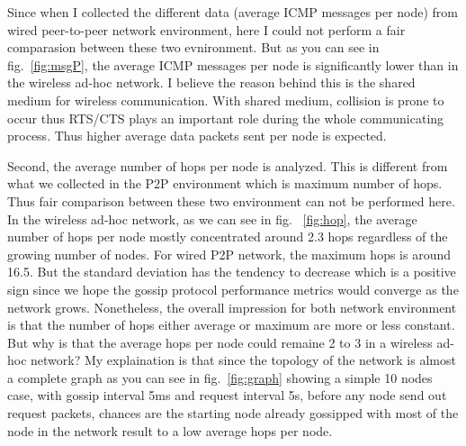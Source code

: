 %
%

Since when I collected the different data (average ICMP messages per node) from wired peer-to-peer network environment, here I could not perform a fair comparasion between these two evnironment. But as you can see in fig.~\ref{fig:msgP}, the average ICMP messages per node is significantly lower than in the wireless ad-hoc network. I believe the reason behind this is the shared medium for wireless communication. With shared medium, collision is prone to occur thus RTS/CTS plays an important role during the whole communicating process. Thus higher average data packets sent per node is expected.

Second, the average number of hops per node is analyzed. This is different from what we collected in the P2P environment which is maximum number of hops. Thus fair comparison between these two environment can not be performed here. In the wireless ad-hoc network, as we can see in fig. ~\ref{fig:hop}, the average number of hops per node mostly concentrated around 2.3 hops regardless of the growing number of nodes. For wired P2P network, the maximum hops is around 16.5. But the standard deviation has the tendency to decrease which is a positive sign since we hope the gossip protocol performance metrics would converge as the network grows. Nonetheless, the overall impression for both network environment is that the number of hops either average or maximum are more or less constant. But why is that the average hops per node could remaine 2 to 3 in a wireless ad-hoc network? My explaination is that since the topology of the network is almost a complete graph as you can see in fig.~\ref{fig:graph} showing a simple 10 nodes case, with gossip interval 5ms and request interval 5s, before any node send out request packets, chances are the starting node already gossipped with most of the node in the network result to a low average hops per node.

